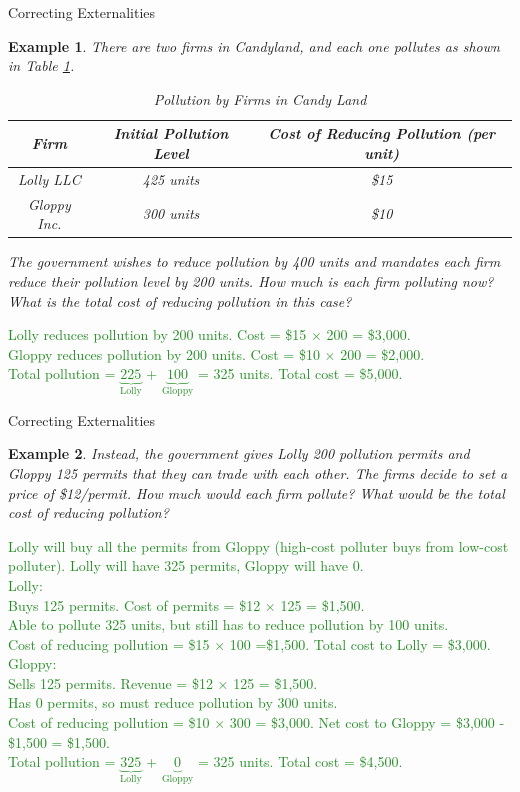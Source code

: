\documentclass[xcolor={dvipsnames},pdf, hyperref={colorlinks=true, citecolor=ForestGreen, linkcolor=BlueViolet, urlcolor=Magenta}]{beamer}
\newtheorem{exmp}{Example}[section]
\newcommand{\ddp}[1]{{\textcolor{ForestGreen}{#1}}}
\begin{document}
\begin{frame}{Correcting Externalities}
\begin{exmp} 
	\scriptsize
	There are two firms in Candyland, and each one pollutes as shown in Table \ref{pollution}.
	
	\begin{table}[H]
		\caption{Pollution by Firms in Candy Land}
		\label{pollution}
		\centering
		\begin{tabular}{ c|c|c}        
			
			Firm   & Initial Pollution Level  & Cost of Reducing Pollution (per unit)\\
			\hline
			Lolly LLC & 425 units & \$15 \\
			Gloppy Inc. & 300 units & \$10 \\
		\end{tabular}
	\end{table} 
	The government wishes to reduce pollution by 400 units and mandates each firm reduce their pollution level by 200 units. How much is each firm polluting now? What is the total cost of reducing pollution in this case?
\end{exmp}
\pause \scriptsize	\ddp{Lolly reduces pollution by 200 units. Cost = \$15 $\times$ 200 = \$3,000. \\
	Gloppy reduces pollution by 200 units. Cost = \$10 $\times$ 200 = \$2,000. \\
	Total pollution = $\underbrace{225}_{\text{Lolly}}$ + $\underbrace{100}_{\text{Gloppy}}$ = 325 units. Total cost = \$5,000.}
\end{frame}

\begin{frame}{Correcting Externalities}
\begin{exmp}
	\scriptsize
Instead, the government gives Lolly 200 pollution permits and Gloppy 125 permits that they can trade with each other. The firms decide to set a price of \$12/permit. How much would each firm pollute? What would be the total cost of reducing pollution?
\end{exmp}
\pause \scriptsize \ddp{Lolly will buy all the permits from Gloppy (high-cost polluter buys from low-cost polluter). Lolly will have 325 permits, Gloppy will have 0. \\
	Lolly: \\
	Buys 125 permits. Cost of permits = \$12 $\times$ 125 = \$1,500. \\ Able to pollute 325 units, but still has to reduce pollution by 100 units.\\ Cost of reducing pollution = \$15 $\times$  100 =\$1,500. Total cost to Lolly = \$3,000. \\
	Gloppy: \\
	Sells 125 permits. Revenue = \$12 $\times$ 125 = \$1,500. \\
	Has 0 permits, so must reduce pollution by 300 units. 
	\\Cost of reducing pollution = \$10 $\times$ 300 = \$3,000. Net cost to Gloppy = \$3,000 - \$1,500 = \$1,500. \\
	Total pollution = $\underbrace{325}_{\text{Lolly}}$ + $\underbrace{0}_{\text{Gloppy}}$ = 325 units. Total cost = \$4,500.}
\end{frame}
\end{document}
